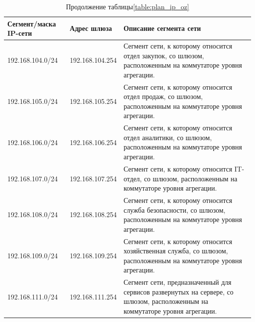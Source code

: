 \begin{table}[H]
\centering
{}
\caption{Продолжение таблицы\;\ref{table:plan_ip_oz}}
\small
\begin{tabularx}{\textwidth}{|X|X|X|}
    \hline
	Сегмент/маска IP-сети	&	Адрес шлюза		&	Описание сегмента сети 		\\ \hline
	192.168.104.0/24			&	192.168.104.254	& Сегмент сети, к которому относится отдел закупок, со шлюзом, расположенным на коммутаторе уровня агрегации. 			\\ \hline
	192.168.105.0/24			&	192.168.105.254	& Сегмент сети, к которому относится отдел продаж, со шлюзом, расположенным на коммутаторе уровня агрегации. 			\\ \hline
	192.168.106.0/24			&	192.168.106.254	& Сегмент сети, к которому относится отдел аналитики, со шлюзом, расположенным на коммутаторе уровня агрегации. 		\\	\hline 
	192.168.107.0/24			&	192.168.107.254	& Сегмент сети, к которому относится IT-отдел, со шлюзом, расположенным на коммутаторе уровня агрегации. 				\\ 	\hline
	192.168.108.0/24			&	192.168.108.254	& Сегмент сети, к которому относится служба безопасности, со шлюзом, расположенным на коммутаторе уровня агрегации. 	\\ \hline
	192.168.109.0/24			&	192.168.109.254	& Сегмент сети, к которому относится хозяйственная служба, со шлюзом, расположенным на коммутаторе уровня агрегации.	\\ \hline
	192.168.111.0/24			&	192.168.111.254	& Сегмент сети, предназначенный для сервисов развернутых на сервере, со шлюзом, расположенным на коммутаторе уровня агрегации.	\\ \hline
\end{tabularx}
\end{table}


